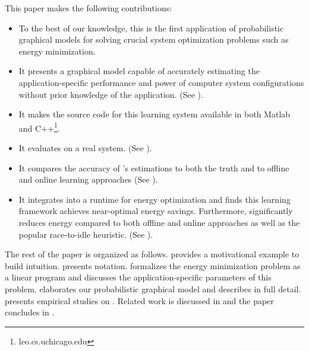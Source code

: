 This paper makes the following contributions:
\begin{itemize}
\item To the best of our knowledge, this is the first application of
  probabilistic graphical models for solving crucial system
  optimization problems such as energy minimization.
\item It presents a graphical model capable of accurately
  estimating the application-specific performance and power of
  computer system configurations without prior knowledge of the
  application. (See ).
\item It makes the source code for this learning system available in
  both Matlab and C++\footnote{leo.cs.uchicago.edu}.
\item It evaluates \SYSTEMLEO{} on a real system. (See
  ).
\item It compares the accuracy of \SYSTEMLEO{}'s estimations to both the
  truth and to offline and online learning approaches (See
  ).
\item It integrates \SYSTEMLEO{} into a runtime for energy optimization
  and finds this learning framework achieves near-optimal energy
  savings.  Furthermore, \SYSTEMLEO{} significantly reduces energy
  compared to both offline and online approaches as well as the
  popular race-to-idle heuristic.  (See
  ).
\end{itemize}

The rest of the paper is organized as follows. 
provides a motivational example to build intuition.
 presents notation.
 formalizes the energy minimization
problem as a linear program and discusses the application-specific
parameters of this problem.   elaborates our probabilistic graphical model and describes \SYSTEMLEO{} in full detail.
 presents empirical studies on \SYSTEMLEO{}.
Related work is discussed in  and the paper
concludes in .
